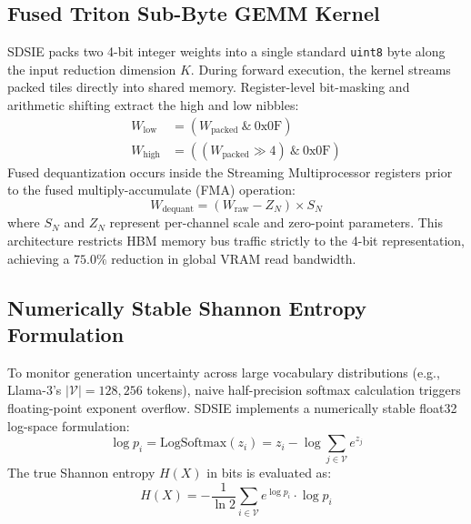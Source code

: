 \documentclass[10pt,journal,compsoc,twocolumn]{IEEEtran}
\begin{document}
\subsection{Fused Triton Sub-Byte GEMM Kernel}
SDSIE packs two 4-bit integer weights into a single standard \texttt{uint8} byte along the input reduction dimension $K$. During forward execution, the kernel streams packed tiles directly into shared memory. Register-level bit-masking and arithmetic shifting extract the high and low nibbles:
\begin{align}
W_{\text{low}} &= (W_{\text{packed}} \ \& \ \text{0x0F}) \\
W_{\text{high}} &= ((W_{\text{packed}} \gg 4) \ \& \ \text{0x0F})
\end{align}
Fused dequantization occurs inside the Streaming Multiprocessor registers prior to the fused multiply-accumulate (FMA) operation:
\begin{equation}
W_{\text{dequant}} = (W_{\text{raw}} - Z_N) \times S_N
\end{equation}
where $S_N$ and $Z_N$ represent per-channel scale and zero-point parameters. This architecture restricts HBM memory bus traffic strictly to the 4-bit representation, achieving a $75.0\%$ reduction in global VRAM read bandwidth.

\subsection{Numerically Stable Shannon Entropy Formulation}
To monitor generation uncertainty across large vocabulary distributions (e.g., Llama-3's $|\mathcal{V}| = 128,256$ tokens), naive half-precision softmax calculation triggers floating-point exponent overflow. SDSIE implements a numerically stable float32 log-space formulation:
\begin{equation}
\log p_i = \text{LogSoftmax}(z_i) = z_i - \log \sum_{j \in \mathcal{V}} e^{z_j}
\end{equation}
The true Shannon entropy $H(X)$ in bits is evaluated as:
\begin{equation}
H(X) = - \frac{1}{\ln 2} \sum_{i \in \mathcal{V}} e^{\log p_i} \cdot \log p_i
\end{equation}
\end{document}

